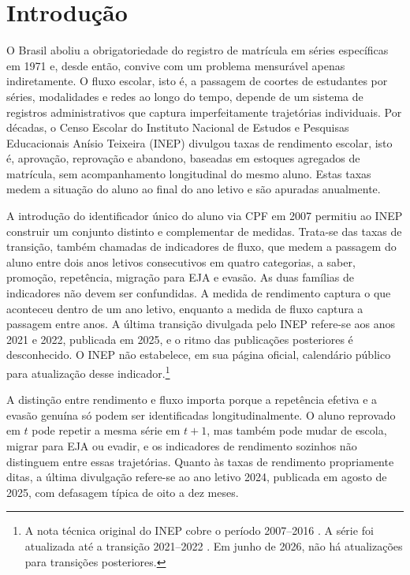 
\section{Introdução}
\label{sec:introducao}

O Brasil aboliu a obrigatoriedade do registro de matrícula em séries
específicas em 1971 e, desde então, convive com um problema mensurável
apenas indiretamente. O fluxo escolar, isto é, a passagem de coortes de
estudantes por séries, modalidades e redes ao longo do tempo, depende de
um sistema de registros administrativos que captura imperfeitamente
trajetórias individuais. Por décadas, o Censo Escolar do Instituto
Nacional de Estudos e Pesquisas Educacionais Anísio Teixeira (INEP)
divulgou taxas de rendimento escolar, isto é, aprovação, reprovação e
abandono, baseadas em estoques agregados de matrícula, sem
acompanhamento longitudinal do mesmo aluno. Estas taxas medem a
situação do aluno ao final do ano letivo e são apuradas anualmente.

A introdução do identificador único do aluno via CPF em 2007 permitiu
ao INEP construir um conjunto distinto e complementar de medidas. Trata-se
das taxas de transição, também chamadas de indicadores de fluxo, que
medem a passagem do aluno entre dois anos letivos consecutivos em
quatro categorias, a saber, promoção, repetência, migração para EJA e
evasão. As duas famílias de indicadores não devem ser confundidas. A
medida de rendimento captura o que aconteceu dentro de um ano letivo,
enquanto a medida de fluxo captura a passagem entre anos. A última
transição divulgada pelo INEP refere-se aos anos 2021 e 2022, publicada
em 2025, e o ritmo das publicações posteriores é desconhecido. O INEP
não estabelece, em sua página oficial, calendário público para
atualização desse indicador.\footnote{A nota técnica original do INEP
cobre o período 2007--2016 \citep{INEP2017_fluxo}. A série foi atualizada
até a transição 2021--2022 \citep{INEP_transicao}. Em junho de 2026,
não há atualizações para transições posteriores.}

A distinção entre rendimento e fluxo importa porque a repetência
efetiva e a evasão genuína só podem ser identificadas longitudinalmente.
O aluno reprovado em $t$ pode repetir a mesma série em $t+1$, mas
também pode mudar de escola, migrar para EJA ou evadir, e os indicadores
de rendimento sozinhos não distinguem entre essas trajetórias. Quanto às
taxas de rendimento propriamente ditas, a última divulgação refere-se ao
ano letivo 2024, publicada em agosto de 2025, com defasagem típica de
oito a dez meses.


